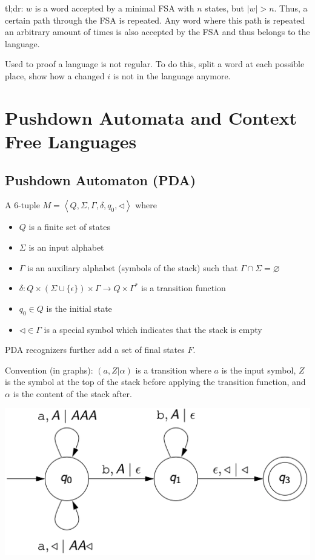 \documentclass[9pt, twocolumn]{extarticle}
\newcommand{\definition}[2]{%
  \begin{definitionbox}{\titlecap{#1}}
    #2
  \end{definitionbox}
}
\begin{document}
tl;dr: $w$ is a word accepted by a minimal FSA with $n$ states, but $|w| > n$. Thus, a certain path through the FSA is repeated. Any word where this path is repeated an arbitrary amount of times is also accepted by the FSA and thus belongs to the language.

Used to proof a language is not regular. To do this, split a word at each possible place, show how a changed $i$ is not in the language anymore.

\section{Pushdown Automata and Context Free Languages}

\subsection{Pushdown Automaton (PDA)}

\definition{Pushdown Automaton}{
  A 6-tuple $M=\left\langle Q, \Sigma, \Gamma, \delta, q_0, \triangleleft\right\rangle$ where
  \begin{itemize}
    \item $Q$ is a finite set of states
    \item $\Sigma$ is an input alphabet
    \item $\Gamma$ is an auxiliary alphabet (symbols of the stack) such that $\Gamma \cap \Sigma=\varnothing$
    \item $\delta: Q \times(\Sigma \cup\{\epsilon\}) \times \Gamma \rightarrow Q \times \Gamma^*$ is a transition function
    \item $q_0 \in Q$ is the initial state
    \item $\triangleleft \in \Gamma$ is a special symbol which indicates that the stack is empty
  \end{itemize}
  PDA recognizers further add a set of final states $F$.
}
Convention (in graphs): $(a,Z|\alpha)$ is a transition where $a$ is the input symbol, $Z$ is the symbol at the top of the stack before applying the transition function, and $\alpha$ is the content of the stack after.

\includegraphics[width=0.95\columnwidth]{assets/pda.png}
\end{document}
